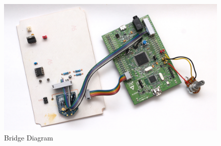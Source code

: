 \begin{figure}[H]
\begin{center}
\includegraphics[width=12cm]{images/photos/edited/scale2}
\end{center}
\caption{Bridge Diagram}
\label{fig:Bridge Diagram}
\end{figure}
